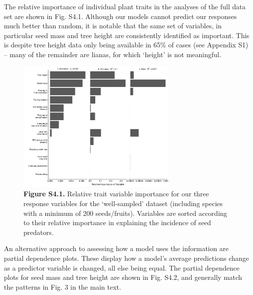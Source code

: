 \documentclass[11pt]{article}
\begin{document}
The relative importance of individual plant traits in the analyses of the full data set are shown in Fig. S4.1. Although our models cannot predict our responses much better than random, it is notable that the same set of variables, in particular seed mass and tree height are consistently identified as important. This is despite tree height data only being available in 65\% of cases (see Appendix S1) – many of the remainder are lianas, for which ‘height’ is not meaningful. 



\begin{figure}[H]
\centering\includegraphics[width=0.7\textwidth]{../Figures/VarImpPlot.pdf} 
\caption[]{\textbf{Figure S4.1.} Relative trait variable importance for our three response variables for the ‘well-sampled' dataset (including species with a minimum of 200 seeds/fruits). Variables are sorted according to their relative importance in explaining the incidence of seed predators. }
\end{figure}


An alternative approach to assessing how a model uses the information are partial dependence plots. These display how a model’s average predictions change as a predictor variable is changed, all else being equal. The partial dependence plots for seed mass and tree height are shown in Fig. S4.2, and generally match the patterns in Fig. 3 in the main text. 
\end{document}
